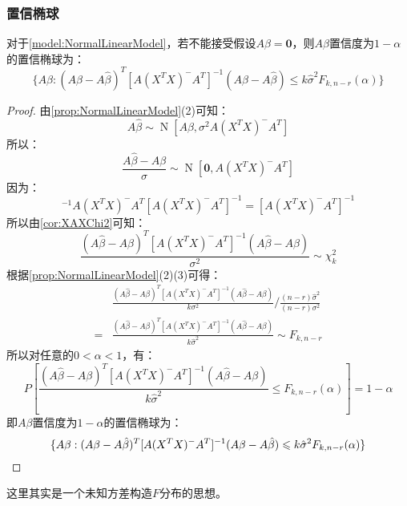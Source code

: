\subsubsection{置信椭球}
\begin{theorem}\label{theo:NormalLinearModelConfidenceEllipsoid}
	对于\cref{model:NormalLinearModel}，若不能接受假设$A\beta=\mathbf{0}$，则$A\beta$置信度为$1-\alpha$的置信椭球为：
	\begin{equation*}
		\{A\beta:(A\beta-A\hat{\beta})^T[A(X^TX)^-A^T]^{-1}(A\beta-A\hat{\beta})\leqslant k\hat{\sigma}^2F_{k,n-r}(\alpha)\}
	\end{equation*}
\end{theorem}
\begin{proof}
	由\cref{prop:NormalLinearModel}(2)可知：
	\begin{equation*}
		A\hat{\beta}\sim\operatorname{N}[A\beta,\sigma^2A(X^TX)^-A^T]
	\end{equation*}
	所以：
	\begin{equation*}
		\frac{A\hat{\beta}-A\beta}{\sigma}\sim\operatorname{N}[\mathbf{0},A(X^TX)^-A^T]
	\end{equation*}
	因为：
	\begin{equation*}
		[A(X^TX)^-A^T]^{-1}A(X^TX)^-A^T[A(X^TX)^-A^T]^{-1}=[A(X^TX)^-A^T]^{-1}
	\end{equation*}
	所以由\cref{cor:XAXChi2}可知：
	\begin{equation*}
		\frac{(A\hat{\beta}-A\beta)^T[A(X^TX)^-A^T]^{-1}(A\hat{\beta}-A\beta)}{\sigma^2}\sim\chi_{k}^2
	\end{equation*}
	根据\cref{prop:NormalLinearModel}(2)(3)可得：
	\begin{align*}
		&\frac{(A\hat{\beta}-A\beta)^T[A(X^TX)^-A^T]^{-1}(A\hat{\beta}-A\beta)}{k\sigma^2}\Big/\frac{(n-r)\hat{\sigma}^2}{(n-r)\sigma^2} \\
		=&\frac{(A\hat{\beta}-A\beta)^T[A(X^TX)^-A^T]^{-1}(A\hat{\beta}-A\beta)}{k\hat{\sigma}^2}\sim F_{k,n-r}
	\end{align*}
	所以对任意的$0<\alpha<1$，有：
	\begin{equation*}
		P\left[\frac{(A\hat{\beta}-A\beta)^T[A(X^TX)^-A^T]^{-1}(A\hat{\beta}-A\beta)}{k\hat{\sigma}^2}\leqslant F_{k,n-r}(\alpha)\right]=1-\alpha
	\end{equation*}
	即$A\beta$置信度为$1-\alpha$的置信椭球为：
	\begin{equation*}
		\{A\beta:(A\beta-A\hat{\beta})^T[A(X^TX)^-A^T]^{-1}(A\beta-A\hat{\beta})\leqslant k\hat{\sigma}^2F_{k,n-r}(\alpha)\}\qedhere
	\end{equation*}
\end{proof}
\begin{note}
	这里其实是一个未知方差构造$F$分布的思想。
\end{note}
